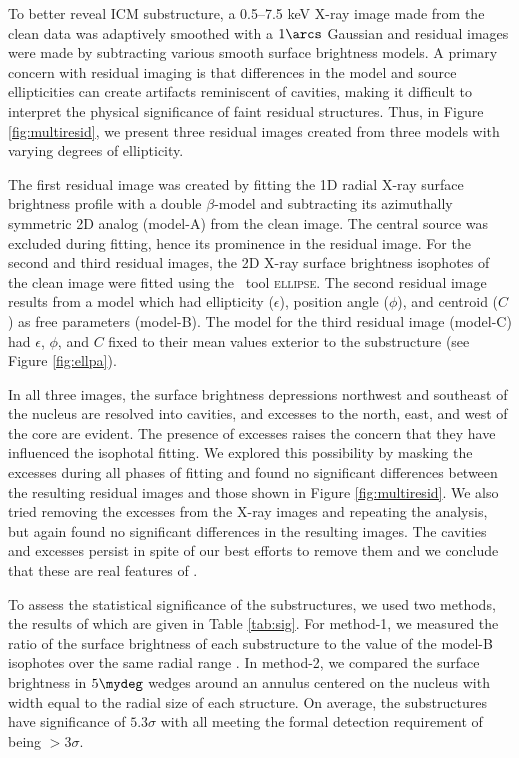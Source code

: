 \documentclass[useAMS,usenatbib]{mn2e}
\begin{document}
To better reveal ICM substructure, a 0.5--7.5 keV X-ray image made
from the clean data was adaptively smoothed with a $1\arcs$ Gaussian
and residual images were made by subtracting various smooth surface
brightness models. A primary concern with residual imaging is that
differences in the model and source ellipticities can create artifacts
reminiscent of cavities, making it difficult to interpret the physical
significance of faint residual structures. Thus, in Figure
\ref{fig:multiresid}, we present three residual images created from
three models with varying degrees of ellipticity.

The first residual image was created by fitting the 1D radial X-ray
surface brightness profile with a double $\beta$-model
\citep{betamodel} and subtracting its azimuthally symmetric 2D analog
(model-A) from the clean image. The central source was excluded during
fitting, hence its prominence in the residual image. For the second
and third residual images, the 2D X-ray surface brightness isophotes
of the clean image were fitted using the \iraf\ tool
\textsc{ellipse}. The second residual image results from a model which
had ellipticity ($\epsilon$), position angle ($\phi$), and centroid
($C$) as free parameters (model-B). The model for the third residual
image (model-C) had $\epsilon$, $\phi$, and $C$ fixed to their mean
values exterior to the substructure (see Figure \ref{fig:ellpa}).

In all three images, the surface brightness depressions northwest and
southeast of the nucleus are resolved into cavities, and excesses to
the north, east, and west of the core are evident. The presence of
excesses raises the concern that they have influenced the isophotal
fitting. We explored this possibility by masking the excesses during
all phases of fitting and found no significant differences between the
resulting residual images and those shown in Figure
\ref{fig:multiresid}. We also tried removing the excesses from the
X-ray images and repeating the analysis, but again found no
significant differences in the resulting images. The cavities and
excesses persist in spite of our best efforts to remove them and we
conclude that these are real features of \irs.

To assess the statistical significance of the substructures, we used
two methods, the results of which are given in Table
\ref{tab:sig}. For method-1, we measured the ratio of the surface
brightness of each substructure to the value of the model-B isophotes
over the same radial range \citep[see][for a similar
  approach]{hydraa}. In method-2, we compared the surface brightness
in $5\mydeg$ wedges around an annulus centered on the nucleus with
width equal to the radial size of each structure. On average, the
substructures have significance of $5.3\sigma$ with all meeting the
formal detection requirement of being $>3\sigma$.
\end{document}
